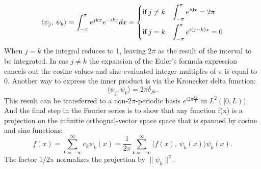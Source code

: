 \documentclass[phd,black, hidelinks]{PrincetonThesis}
\newcommand{\euler}{e}
\begin{document}
\begin{equation}
\langle \psi_j,\,\psi_k \rangle = \int_{-\pi}^{\pi} \euler^{jkx} \euler^{-ikx}dx =
\begin{dcases}
\mathrm{if} \, j \neq k & \int_{-\pi}^{\pi} \euler^{i0x} =  2\pi \\
\mathrm{if} \, j = k & \int_{-\pi}^{\pi} \euler^{i(j-k)x} =  0 \\
\end{dcases}
\end{equation}
When \(j = k\) the integral reduces to 1, leaving \(2\pi\) as the result of the interval to be integrated. In cas \(j \neq k\) the expansion of the Euler's formula expression cancels out the cosine values and sine evaluated integer multiples of \(\pi\) is equal to \(0\). Another way to express the inner product is via the Kronecker delta function:
\begin{equation}
\langle \psi_j, \psi_k \rangle = 2\pi \delta_{jk}.
\end{equation}
This result can be transferred to a non-2\(\pi\)-periodic basis \(e^{i2\pi \frac{kx}{L}}\) in \(L^2 ([0,L))\). And the final step in the Fourier series is to show that any function f(x) is a projection on the infinitie orthognal-vector space  space that is spanned by cosine and sine functions:
\begin{equation}
f(x) = \sum_{k=-\infty}^{\infty} c_k \psi_k(x) = \frac{1}{2\pi} \sum_{k=-\infty}^{\infty} \langle f(x),\,\psi_k(x)\rangle\psi_k(x).
\end{equation}
The factor \(1/2\pi\) normalizes the projection by \(\|\psi_k\|^2\).
\end{document}
